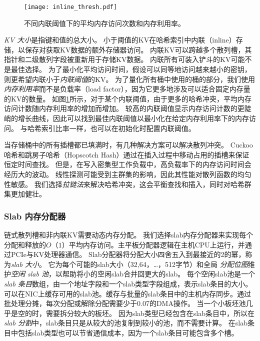 \begin{figure}[t]
\centering
\texttt{[image: inline\_thresh.pdf]}
\caption{不同内联阈值下的平均内存访问次数和内存利用率。}
\label{kvdirect:fig:inline-offline}

\end{figure}

\textit {KV 大小}是指键和值的总大小。
小于阈值的KV在哈希索引中内联（inline）存储，以保存对获取KV数据的额外存储器访问。
内联KV可以跨越多个散列槽，其指针和二级散列字段被重新用于存储KV数据。
内联所有可装入铲斗的KV可能不是最佳选择。
为了最小化平均访问时间，假设可以同等地访问越来越小的密钥，则更希望内联小于\textit {内联阈值}的KV。
为了量化所有桶中使用的桶的部分，我们使用\textit {内存利用率}而不是负载率（load factor），因为它更多地涉及可以适合固定内存量的KV的数量。
如图\ref {kvdirect:fig:inline-offline}所示，对于某个内联阈值，由于更多的哈希冲突，平均内存访问计数随内存利用率的增加而增加。
较高的内联阈值显示内存访问计数的更陡峭的增长曲线，因此可以找到最佳内联阈值以最小化在给定内存利用率下的内存访问。
与哈希索引比率一样，也可以在初始化时配置内联阈值。

当存储桶中的所有插槽都已填满时，有几种解决方案可以解决散列冲突。
Cuckoo哈希\cite {pagh2004cuckoo}和跳房子哈希（Hopscotch Hash）\cite {herlihy2008hopscotch}通过在插入过程中移动占用的插槽来保证恒定时间查找。
但是，在写入密集型工作负载中，高负载率下的内存访问时间会经历大的波动。
线性探测可能受到主群集的影响，因此其性能对散列函数的均匀性敏感。
我们选择\textit {拉链法}来解决哈希冲突，这会平衡查找和插入，同时对哈希群集更加健壮。


\subsubsection{Slab 内存分配器}
\label{kvdirect:sec:slab}

链式散列槽和非内联KV需要动态内存分配。
我们选择slab内存分配器\cite {bonwick1994slab}来实现每个分配和释放的$O（1）$平均内存访问。主平板分配器逻辑在主机CPU上运行，并通过PCIe与KV处理器通信。
Slab分配器将分配大小四舍五入到最接近的2的幂，称为\textit {slab 大小}。
它为每个可能的slab大小（32,64，\ldots，512字节）和全局 \textit {分配位图}维护\textit {空闲 slab 池}，以帮助将小的空闲slab合并回更大的slab。
每个空闲slab池是一个\textit {slab 条目}数组，由一个地址字段和一个slab类型字段组成，表示slab条目的大小。
可以在NIC上缓存可用的slab池。缓存与批量的slab条目中的主机内存同步。通过批处理分摊，每次分配或解除分配需要少于0.07的DMA操作。
当一个小板坯池几乎是空的时，需要拆分较大的板坯。
因为slab类型已经包含在slab条目中，所以在\textit {slab 分割}中，slab条目只是从较大的池复制到较小的池，而不需要计算。
在slab条目中包括slab类型也可以节省通信成本，因为一个slab条目可能包含多个槽。

